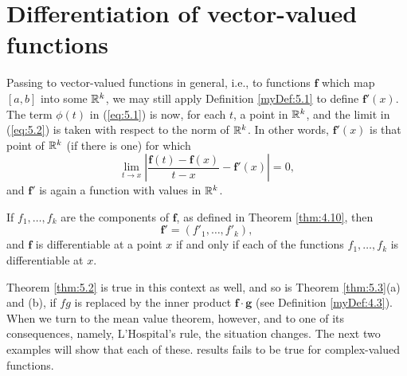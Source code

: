 \section{Differentiation of vector-valued functions}


Passing to vector-valued functions in general, 
i.e., to functions $\mathbf{f}$ which map $[a, b]$ into some ${\protect\mathbb R}^k$, 
we may still apply Definition \ref{myDef:5.1} to define $\mathbf{f}'(x)$. 
The term $\phi(t)$ in (\ref{eq:5.1}) is now, for each $t$, a point in ${\protect\mathbb R}^k$, 
and the limit in (\ref{eq:5.2}) is taken with respect to the norm of ${\protect\mathbb R}^k$. 
In other words, $\mathbf{f}'(x)$ is that point of ${\protect\mathbb R}^k$ 
(if there is one) for which
\begin{equation}
    \label{eq:5.30}
    \lim_{t \to x} \left| \frac{\mathbf{f}(t) - \mathbf{f}(x)}{t-x} - \mathbf{f}'(x)\right|  = 0,
\end{equation}
and $\mathbf{f}'$ is again a function with values in ${\protect\mathbb R}^k$.

If $f_1, \dots, f_k$ are the components of $\mathbf{f}$, 
as defined in Theorem \ref{thm:4.10}, then
\begin{equation}
    \label{eq:4.31}
    \mathbf{f}' = (f'_1,\dots,f'_k),
\end{equation}
and $\mathbf{f}$ is differentiable at a point $x$ 
if and only if each of the functions $f_1, \dots, f_k$
is differentiable at $x$.

Theorem \ref{thm:5.2} is true in this context as well, 
and so is Theorem \ref{thm:5.3}(a) and (b), 
if $fg$ is replaced by the inner product $\mathbf{f} \cdot \mathbf{g}$ (see Definition \ref{myDef:4.3}).
When we turn to the mean value theorem, however, and to one of its
consequences, namely, L'Hospital's rule, the situation changes. 
The next two examples will show that each of these. results fails to be true for complex-valued functions.

